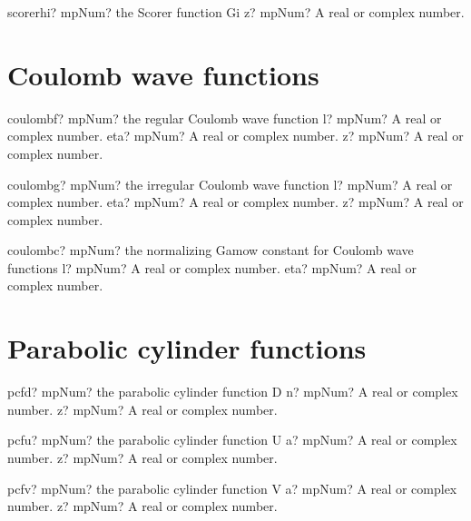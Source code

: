 \documentclass[12pt,a4paper,openany]{book}
\begin{document}
\begin{mpFunctionsExtract}
\mpFunctionOne
{scorerhi? mpNum? the Scorer function Gi}
{z? mpNum? A real or complex number.}
\end{mpFunctionsExtract}

\section{Coulomb wave functions}

\begin{mpFunctionsExtract}
\mpFunctionThree
{coulombf? mpNum? the regular Coulomb wave function}
{l? mpNum? A real or complex number.}
{eta? mpNum? A real or complex number.}
{z? mpNum? A real or complex number.}
\end{mpFunctionsExtract}

\begin{mpFunctionsExtract}
\mpFunctionThree
{coulombg? mpNum? the irregular Coulomb wave function}
{l? mpNum? A real or complex number.}
{eta? mpNum? A real or complex number.}
{z? mpNum? A real or complex number.}
\end{mpFunctionsExtract}

\begin{mpFunctionsExtract}
\mpFunctionTwo
{coulombc? mpNum? the normalizing Gamow constant for Coulomb wave functions}
{l? mpNum? A real or complex number.}
{eta? mpNum? A real or complex number.}
\end{mpFunctionsExtract}

\section{Parabolic cylinder functions}

\begin{mpFunctionsExtract}
\mpFunctionTwo
{pcfd? mpNum? the parabolic cylinder function D}
{n? mpNum? A real or complex number.}
{z? mpNum? A real or complex number.}
\end{mpFunctionsExtract}

\begin{mpFunctionsExtract}
\mpFunctionTwo
{pcfu? mpNum? the parabolic cylinder function U}
{a? mpNum? A real or complex number.}
{z? mpNum? A real or complex number.}
\end{mpFunctionsExtract}

\begin{mpFunctionsExtract}
\mpFunctionTwo
{pcfv? mpNum? the parabolic cylinder function V}
{a? mpNum? A real or complex number.}
{z? mpNum? A real or complex number.}
\end{mpFunctionsExtract}
\end{document}

